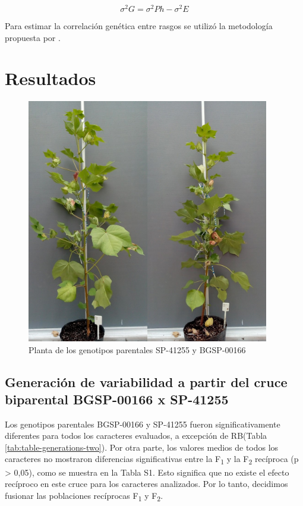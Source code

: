 \documentclass[12pt,oneside]{reedthesis}
\begin{document}
\[ \sigma^{2}G = \sigma^{2}Ph - \sigma^{2}E \]

Para estimar la correlación genética entre rasgos se utilizó la metodología propuesta por \textcite{kearsey1996} .

\section{Resultados}\label{resultados-2}

\begin{figure}
\includegraphics[width=400px]{figure/chap3/Parentales} \caption{Planta de los genotipos parentales SP-41255 y BGSP-00166}\label{fig:img-parental}
\end{figure}

\subsection{Generación de variabilidad a partir del cruce biparental BGSP-00166 x SP-41255}\label{generaciuxf3n-de-variabilidad-a-partir-del-cruce-biparental-bgsp-00166-x-sp-41255}

Los genotipos parentales BGSP-00166 y SP-41255 fueron significativamente diferentes para todos los caracteres evaluados, a excepción de RB(Tabla \ref{tab:table-generations-two}). Por otra parte, los valores medios de todos los caracteres no mostraron diferencias significativas entre la F\textsubscript{1} y la F\textsubscript{2} recíproca (p \textgreater{} 0,05), como se muestra en la Tabla S1. Esto significa que no existe el efecto recíproco en este cruce para los caracteres analizados. Por lo tanto, decidimos fusionar las poblaciones recíprocas F\textsubscript{1} y F\textsubscript{2}.
\end{document}
